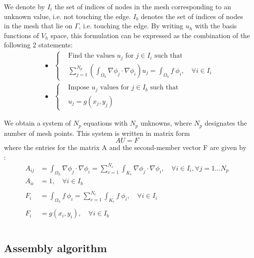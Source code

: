 \documentclass[english,10pt,a4paper]{article}
\begin{document}
We denote by $I_i$ the set of indices of nodes in the mesh corresponding to an unknown value, i.e. not touching the edge.
$I_b$ denotes the set of indices of nodes in the mesh that lie on $\Gamma$, i.e. touching the edge.
By writing $u_h$ with the basis functions of $V_h$ space, this formulation can be expressed as the combination of the following 2 statements:
\begin{eqnarray*}
&\bullet& \left\{
  \begin{aligned}
    &\text{Find the values $u_j$ for $j \in I_i$ such that } \\
    & \sum_{j= 1}^{N_p} \left( \int_{\Omega_h} \nabla \phi_j \cdot \nabla \phi_i \right) u_j= \int_{\Omega_h} f \ \phi_i, \quad \forall i \in I_i
  \end{aligned}
  \right. \\
&\bullet& \left\{
  \begin{aligned}
    &\text{Impose $u_j$ values for $j \in I_b$ such that } \\
    & u_j = g(x_j,y_j)
  \end{aligned}
  \right.
\end{eqnarray*}


We obtain a system of $N_p$ equations with $N_p$ unknowns, where $N_p$ designates the number of mesh points.
This system is written in matrix form
\begin{equation*}
  A U = F
\end{equation*}
where the entries for the matrix A and the second-member vector F are given by :
\begin{align*}
  A_{ij} &= \int_{\Omega_h}  \nabla \phi_j \cdot \nabla \phi_i = \sum_{e=1}^{N_e} \int_{K_e} \nabla \phi_j \cdot \nabla \phi_i ,\quad \forall i \in I_i, \forall j=1...N_p \\
  A_{ii} & = 1, \quad \forall i \in I_b \\\\
  F_i &= \int_{\Omega_h} f \ \phi_i = \sum_{e=1}^{N_e} \int_{K_e} f \ \phi_i , \quad \forall i \in I_i \\\\
  F_i &= g(x_i,y_i), \quad \forall i \in I_b \\\\
\end{align*}

\subsection{Assembly algorithm}
\end{document}
